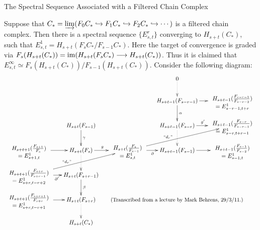 \documentclass[11pt]{article}
\newcommand{\myheading}[1]
{{\noindent\Large #1}

}
\begin{document}
\myheading{The Spectral Sequence Associated with a Filtered Chain Complex}
\newcommand{\theexp}[4]{\raisebox{-.1cm}[.5cm][0cm]{\mbox{$\begin{array}{c}H_{#1}(\frac{F_{#2}}{F_{#3}}) \\=E^1_{#4} \end{array}$}}}%
Suppose that $C_*=\varinjlim(F_0C_*\hookrightarrow F_1C_*\hookrightarrow F_2C_*\hookrightarrow\cdots)$ is a filtered chain complex. Then there is a spectral sequence $\{E^r_{s,t}\}$ converging to $H_{s+t}(C_*)$, such that $E^1_{s,t}=H_{s+t}(F_sC_*/F_{s-1}C_*)$. Here the target of convergence is graded via $F_s(H_{s+t}(C_*))=\operatorname{im}(H_{s+t}(F_sC_*)\longrightarrow H_{s+t}(C_*))$. Thus it is claimed that $E^\infty_{s,t}\simeq F_s(H_{s+t}(C_*))/F_{s-1}(H_{s+t}(C_*))$. Consider the following diagram:
%
\[\xymatrix@C=.5cm@R=.7cm{
&&&0\ar@{.>}[d]&\\
&&&H_{s+t-1}(F_{s-r-1})\ar[d]^\alpha \ar[r]&\theexp{s+t-1}{s-r-1}{s-r-2}{s-r-1,t+r}\\
&H_{s+t}(F_{s-1})\ar[d]^\gamma&&H_{s+t-1}(F_{s-r})\ar@{.>}[d] \ar[r]^{g'\ \ }&\theexp{s+t-1}{s-r}{s-r-1}{s-r,t+r-1}\\
\theexp{s+t+1}{s+1}{s}{s+1,t}\ar[r]&H_{s+t}(F_s)\ar[r]^{g\ \ }\ar@{.>}[d]&
\theexp{s+t}{s}{s-1}{s,t}\ar[r]_\partial\ar[rru]^(.4){\text{``$d_r$''}}
&H_{s+t-1}(F_{s-1}) \ar[r]&\theexp{s+t-1}{s-1}{s-2}{s-1,t}\\
\theexp{s+t+1}{s+r}{s+r-1}{s+r,t-r+2}\ar[r]_{\ \ \partial'}\ar[rru]^(.4){\text{``$d_r$''}}&H_{s+t}(F_{s+r-1})\ar[d]^{\beta}\\
\theexp{s+t+1}{s+r+1}{s+r}{s+r,t-r+1}\ar[r]&H_{s+t}(F_{s+r})\ar@{.>}[d]
&&\makebox[0cm]{
{\small {(Transcribed from a lecture  by Mark Behrens, 29/3/11.)}}
}
\\
&H_{s+t}(C_*)
}\]
\end{document}
